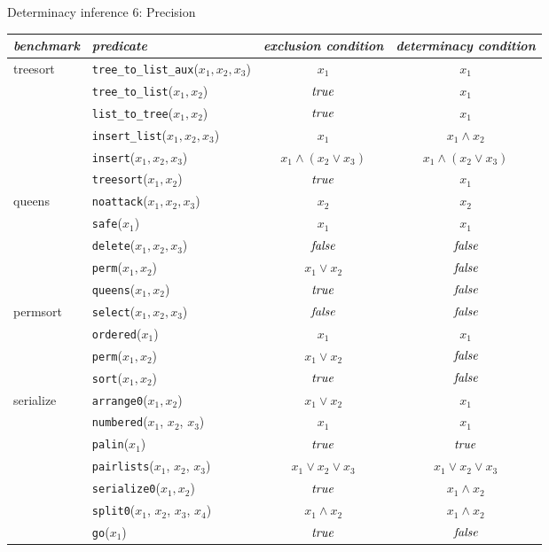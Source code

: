 \documentclass{beamer}
\def\mindthegap     {-0.275ex}
\def\true{{\it true}}
\def\false{{\it false}}
\begin{document}
\begin{frame}{Determinacy inference 6: Precision}

{\footnotesize

\begin{tabular}{l|l|c|c}
\textit{benchmark} & \textit{predicate} & \textit{exclusion
condition}
& \textit{determinacy condition} \\

\hline treesort  & \texttt{tree\_to\_list\_aux}($x_1,x_2,x_3$) &
$x_1$ & $x_1$\\[\mindthegap]
      & \texttt{tree\_to\_list}($x_1,x_2$) & $\true$ & $x_1$\\[\mindthegap]
      & \texttt{list\_to\_tree}($x_1,x_2$) & $\true$ & $x_1$\\[\mindthegap]
      & \texttt{insert\_list}($x_1,x_2,x_3$) & $x_1$ & $x_1\wedge x_2$\\[\mindthegap]
      & \texttt{insert}($x_1,x_2,x_3$) &  $x_1\wedge(x_2\vee x_3)$ & $x_1\wedge(x_2\vee x_3)$\\[\mindthegap]
      & \texttt{treesort}($x_1,x_2$) & $\true$ & $x_1$ \\[\mindthegap]

\cline{1-4}
queens   & \texttt{noattack}($x_1,x_2,x_3$) & $x_2$ & $x_2$\\[\mindthegap]
      & \texttt{safe}($x_1$) & $x_1$ & $x_1$\\[\mindthegap]
      & \texttt{delete}($x_1,x_2,x_3$) & $\false$ & $\false$ \\[\mindthegap]
      & \texttt{perm}($x_1,x_2$) & $x_1\vee x_2$ & $\false$ \\[\mindthegap]
      & \texttt{queens}($x_1,x_2$) & $\true$ & $\false$\\[\mindthegap]

\cline{1-4}
permsort  & \texttt{select}($x_1,x_2,x_3$) & $\false$ & $\false$ \\[\mindthegap]
      & \texttt{ordered}($x_1$) & $x_1$ & $x_1$ \\[\mindthegap]
      & \texttt{perm}($x_1,x_2$) & $x_1\vee x_2$ & $\false$ \\[\mindthegap]
      & \texttt{sort}($x_1,x_2$) & $\true$ & $\false$\\[\mindthegap]

\cline{1-4} serialize & \texttt{arrange0}($x_1,x_2$) & $x_1\vee x_2$ & $x_1$ \\[\mindthegap]
      & \texttt{numbered}($x_1$, $x_2$, $x_3$) & $x_1$ & $x_1$ \\[\mindthegap]
      & \texttt{palin}($x_1$) & $\true$ & $\true$\\[\mindthegap]
      & \texttt{pairlists}($x_1$, $x_2$, $x_3$) & $x_1\vee x_2\vee x_3$ & $x_1\vee x_2\vee x_3$ \\[\mindthegap]
    & \texttt{serialize0}($x_1,x_2$) & $\true$ & $x_1\wedge x_2$ \\[\mindthegap]
      & \texttt{split0}($x_1$, $x_2$, $x_3$, $x_4$) & $x_1\wedge x_2$ & $x_1\wedge x_2$\\[\mindthegap]
      & \texttt{go}($x_1$) & $\true$ & $\false$
\end{tabular}
}

\end{frame}
\end{document}
